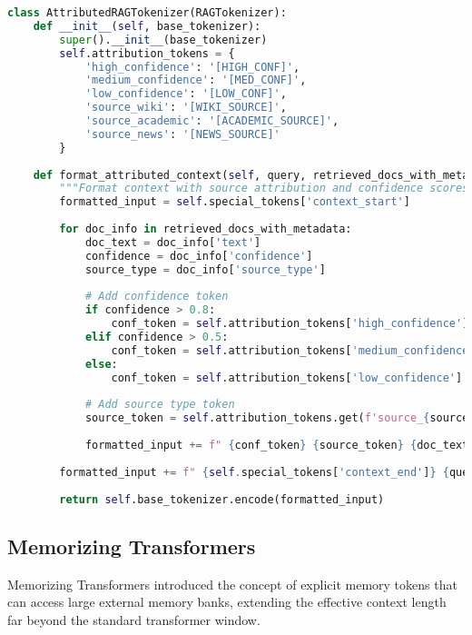 \begin{lstlisting}[language=Python, caption=Knowledge source attribution tokens]
class AttributedRAGTokenizer(RAGTokenizer):
    def __init__(self, base_tokenizer):
        super().__init__(base_tokenizer)
        self.attribution_tokens = {
            'high_confidence': '[HIGH_CONF]',
            'medium_confidence': '[MED_CONF]',
            'low_confidence': '[LOW_CONF]',
            'source_wiki': '[WIKI_SOURCE]',
            'source_academic': '[ACADEMIC_SOURCE]',
            'source_news': '[NEWS_SOURCE]'
        }
    
    def format_attributed_context(self, query, retrieved_docs_with_metadata):
        """Format context with source attribution and confidence scores"""
        formatted_input = self.special_tokens['context_start']
        
        for doc_info in retrieved_docs_with_metadata:
            doc_text = doc_info['text']
            confidence = doc_info['confidence']
            source_type = doc_info['source_type']
            
            # Add confidence token
            if confidence > 0.8:
                conf_token = self.attribution_tokens['high_confidence']
            elif confidence > 0.5:
                conf_token = self.attribution_tokens['medium_confidence']
            else:
                conf_token = self.attribution_tokens['low_confidence']
            
            # Add source type token
            source_token = self.attribution_tokens.get(f'source_{source_type}', '[UNKNOWN_SOURCE]')
            
            formatted_input += f" {conf_token} {source_token} {doc_text} {self.special_tokens['doc_boundary']}"
        
        formatted_input += f" {self.special_tokens['context_end']} {query}"
        
        return self.base_tokenizer.encode(formatted_input)
\end{lstlisting}

\subsection{Memorizing Transformers}

Memorizing Transformers introduced the concept of explicit memory tokens that can access large external memory banks, extending the effective context length far beyond the standard transformer window.

